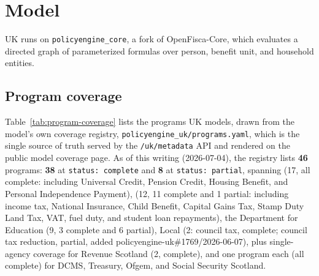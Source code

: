 \section{Model}
\label{sec:model}

\policyengine{} UK runs on \texttt{policyengine\_core}, a fork of
OpenFisca-Core, which evaluates a directed graph of parameterized formulas
over person, benefit unit, and household entities. 

\subsection{Program coverage}
\label{sec:model-coverage}

Table~\ref{tab:program-coverage} lists the programs \policyengine{} UK
models, drawn from the model's own coverage registry,
\texttt{policyengine\_uk/programs.yaml}, which is the single source of truth
served by the \texttt{/uk/metadata} API and rendered on the public model
coverage page. As of this writing (2026-07-04), the registry lists
\textbf{46} programs: \textbf{38} at \texttt{status: complete} and
\textbf{8} at \texttt{status: partial}, spanning \dwp{} (17, all complete:
including Universal Credit, Pension Credit, Housing Benefit, and Personal
Independence Payment), \hmrc{} (12, 11 complete and 1 partial: including
income tax, National Insurance, Child Benefit, Capital Gains Tax, Stamp
Duty Land Tax, VAT, fuel duty, and student loan repayments), the Department
for Education (9, 3 complete and 6 partial), Local (2: council tax,
complete; council tax reduction, partial, added
policyengine-uk\#1769/2026-06-07), plus single-agency coverage for Revenue
Scotland (2, complete), and one program each (all complete) for DCMS,
Treasury, Ofgem, and Social Security Scotland.

